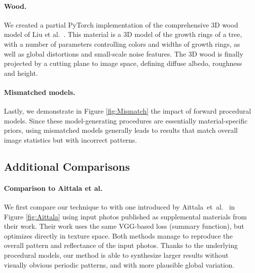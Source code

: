 \paragraph*{Wood.} We  created a partial \textsf{PyTorch} implementation of the comprehensive 3D wood model of Liu et al.~\cite{Liu2016}. This material is a 3D model of the growth rings of a tree, with a number of parameters controlling colors and widths of growth rings, as well as global distortions and small-scale noise features. The 3D wood is finally projected by a cutting plane to image space, defining diffuse albedo, roughness and height.



\paragraph*{Mismatched models.}
Lastly, we demonstrate in Figure \ref{fig:Mismatch} the impact of forward procedural models.
Since these model-generating procedures are essentially material-specific priors, using mismatched models generally leads to results that match overall image statistics but with incorrect patterns.

\subsection{Additional Comparisons}



\paragraph*{Comparison to Aittala et al.}
We first compare our technique to with one introduced by Aittala~et~al.~\cite{Aittala2016} in Figure \ref{fig:Aittala} using input photos published as supplemental materials from their work.
Their work uses the same VGG-based loss (summary function), but optimizes directly in texture space. Both methods manage to reproduce the overall pattern and reflectance of the input photos.
Thanks to the underlying procedural models, our method is able to synthesize larger results without visually obvious periodic patterns, and with more plausible global variation.





